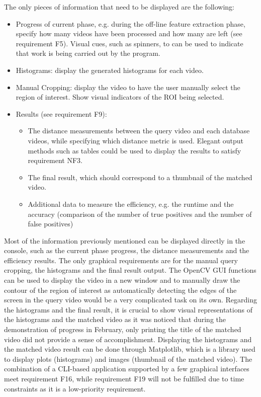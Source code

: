 The only pieces of information that need to be displayed are the following:
\begin{itemize}
    \item Progress of current phase, e.g. during the off-line feature extraction phase, specify how many videos have been processed and how many are left (see requirement F5). Visual cues, such as spinners, to can be used to indicate that work is being carried out by the program.
    \item Histograms: display the generated histograms for each video.
    \item Manual Cropping: display the video to have the user manually select the region of interest. Show visual indicators of the ROI being selected.
    \item Results (see requirement F9):
    \begin{itemize}
        \item The distance measurements between the query video and each database videos, while specifying which distance metric is used. Elegant output methods such as tables could be used to display the results to satisfy requirement NF3.
        \item The final result, which should correspond to a thumbnail of the matched video.
        \item Additional data to measure the efficiency, e.g. the runtime and the accuracy (comparison of the number of true positives and the number of false positives)
    \end{itemize}
\end{itemize}

Most of the information previously mentioned can be displayed directly in the console, such as the current phase progress, the distance measurements and the efficiency results. The only graphical requirements are for the manual query cropping, the histograms and the final result output. The OpenCV GUI functions can be used to display the video in a new window and to manually draw the contour of the region of interest as automatically detecting the edges of the screen in the query video would be a very complicated task on its own. Regarding the histograms and the final result, it is crucial to show visual representations of the histograms and the matched video as it was noticed that during the demonstration of progress in February, only printing the title of the matched video did not provide a sense of accomplishment. Displaying the histograms and the matched video result can be done through Matplotlib, which is a library used to display plots (histograms) and images (thumbnail of the matched video). The combination of a CLI-based application supported by a few graphical interfaces meet requirement F16, while requirement F19 will not be fulfilled due to time constraints as it is a low-priority requirement.

